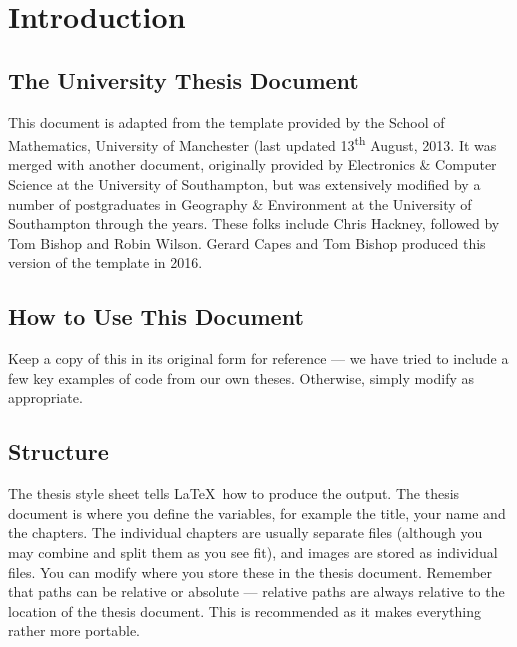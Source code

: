 \chapter{Introduction}
\section{The University Thesis Document}
This document is adapted from the template provided by the School of Mathematics, University of Manchester (last updated 13\textsuperscript{th} August, 2013. It was merged with another document, originally provided by Electronics \& Computer Science at the University of Southampton, but was extensively modified by a number of postgraduates in Geography \& Environment at the University of Southampton through the years. These folks include Chris Hackney, followed by Tom Bishop and Robin Wilson. Gerard Capes and Tom Bishop produced this version of the template in 2016.

\section{How to Use This Document}
Keep a copy of this in its original form for reference --- we have tried to include a few key examples of code from our own theses. Otherwise, simply modify as appropriate.

\section{Structure}
The thesis style sheet tells \LaTeX \ how to produce the output. The thesis document is where you define the variables, for example the title, your name and the chapters. The individual chapters are usually separate files (although you may combine and split them as you see fit), and images are stored as individual files. You can modify where you store these in the thesis document. Remember that paths can be relative or absolute --- relative paths are always relative to the location of the thesis document. This is recommended as it makes everything rather more portable.